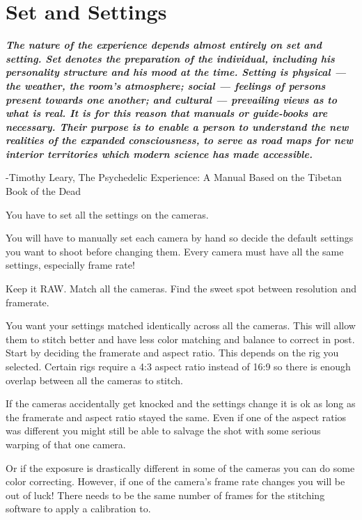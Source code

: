 \chapter{Set and Settings}
\pagecolor{white}
\label{chap:6}
\begin{fullwidth}


{\itshape\bfseries The nature of the experience depends almost entirely on set and setting. Set denotes the preparation of the individual, including his personality structure and his mood at the time. Setting is physical — the weather, the room’s atmosphere; social — feelings of persons present towards one another; and cultural — prevailing views as to what is real. It is for this reason that manuals or guide-books are necessary. Their purpose is to enable a person to understand the new realities of the expanded consciousness, to serve as road maps for new interior territories which modern science has made accessible.}

-Timothy Leary, The Psychedelic Experience: A Manual Based on the Tibetan Book of the Dead
\vspace{\baselineskip}

\problem

{\large You have to set all the settings on the cameras. \par}

You will have to manually set each camera by hand so decide the default settings you want to shoot before changing them. Every camera must have all the same settings, especially frame rate!

\solution

{\large Keep it RAW. Match all the cameras. Find the sweet spot between resolution and framerate. \par}

You want your settings matched identically across all the cameras. This will allow them to stitch better and have less color matching and balance to correct in post. Start by deciding the framerate and aspect ratio. This depends on the rig you selected. Certain rigs require a 4:3 aspect ratio instead of 16:9 so there is enough overlap between all the cameras to stitch. 

If the cameras accidentally get knocked and the settings change it is ok as long as the framerate and aspect ratio stayed the same. Even if one of the aspect ratios was different you might still be able to salvage the shot with some serious warping of that one camera. 

Or if the exposure is drastically different in some of the cameras you can do some color correcting. However, if one of the camera’s frame rate changes you will be out of luck! There needs to be the same number of frames for the stitching software to apply a calibration to. 


\end{fullwidth}
